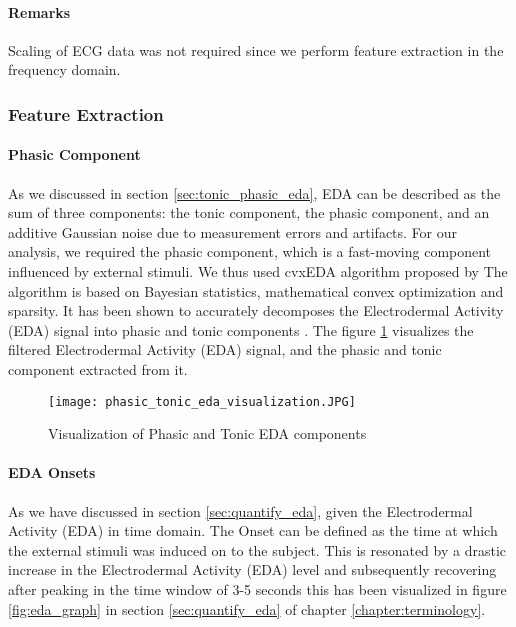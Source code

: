 \paragraph{Remarks} Scaling of ECG data was not required since we perform feature extraction in the frequency domain.

\subsubsection{Feature Extraction}
\label{sec:eda_fet_ext}
\paragraph{Phasic Component} As we discussed in section \ref{sec:tonic_phasic_eda}, EDA can be described as the sum of three components: the tonic component, the phasic component, and an additive Gaussian noise due to measurement errors and artifacts. For our analysis, we required the phasic component, which is a fast-moving component influenced by external stimuli. We thus used cvxEDA algorithm proposed by \citeauthor{greco_cvxeda:_2016} The algorithm is based on Bayesian statistics, mathematical convex optimization and sparsity. It has been shown to accurately decomposes the Electrodermal Activity (EDA) signal into phasic and tonic components \cite{greco_cvxeda:_2016}. The figure \ref{fig:phasic_tonic_visualization} visualizes the filtered Electrodermal Activity (EDA) signal, and the phasic and tonic component extracted from it. 

\begin{figure}
    \centering
    \texttt{[image: phasic\_tonic\_eda\_visualization.JPG]}
    \caption{Visualization of Phasic and Tonic EDA components}
    \label{fig:phasic_tonic_visualization}
\end{figure}


\paragraph{EDA Onsets} As we have discussed in section \ref{sec:quantify_eda}, given the Electrodermal Activity (EDA) in time domain. The Onset can be defined as the time at which the external stimuli was induced on to the subject. This is resonated by a drastic increase in the Electrodermal Activity (EDA) level and subsequently recovering after peaking in the time window of 3-5 seconds this has been visualized in figure \ref{fig:eda_graph} in section \ref{sec:quantify_eda} of chapter \ref{chapter:terminology}.

